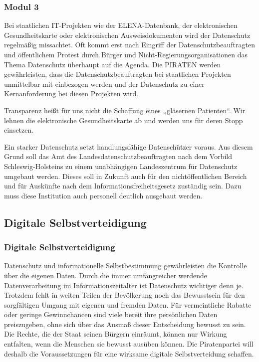 \subsubsection{Modul 3}
\abstimmung
Bei staatlichen IT-Projekten wie der ELENA-Datenbank, der elektronischen Gesundheitskarte oder elektronischen Ausweisdokumenten wird der Datenschutz regelmäßig missachtet. Oft kommt erst nach Eingriff der Datenschutzbeauftragten und öffentlichem Protest durch Bürger und Nicht-Regierungsorganisationen das Thema Datenschutz überhaupt auf die Agenda. Die PIRATEN werden gewährleisten, dass die Datenschutzbeauftragten bei staatlichen Projekten unmittelbar mit einbezogen werden und der Datenschutz zu einer Kernanforderung bei diesen Projekten wird.


\label{datenschutz:egk}
\abstimmung
Transparenz heißt für uns nicht die Schaffung eines „gläsernen Patienten“. Wir lehnen die elektronische Gesundheitskarte ab und werden uns für deren Stopp einsetzen.

\label{datenschutz:staerkung}
\abstimmung
Ein starker Datenschutz setzt handlungsfähige Datenschützer voraus. Aus diesem Grund soll das Amt des Landesdatenschutzbeauftragten nach dem Vorbild Schleswig-Holsteins zu einem unabhängigen Landeszentrum für Datenschutz umgebaut werden. Dieses soll in Zukunft auch für den nichtöffentlichen Bereich und für Auskünfte nach dem Informationsfreiheitsgesetz zuständig sein. Dazu muss diese Institution auch personell deutlich ausgebaut werden.

\subsection*{Digitale Selbstverteidigung}
\label{datenschutz:verteidigung}
\subsubsection{Digitale Selbstverteidigung}
\abstimmung
Datenschutz und informationelle Selbstbestimmung gewährleisten die Kontrolle über die eigenen Daten. Durch die immer umfangreicher werdende Datenverarbeitung im Informationszeitalter ist Datenschutz wichtiger denn je. Trotzdem fehlt in weiten Teilen der Bevölkerung noch das Bewusstsein für den sorgfältigen Umgang mit eigenen und fremden Daten. Für vermeintliche Rabatte oder geringe Gewinnchancen sind viele bereit ihre persönlichen Daten preiszugeben, ohne sich über das Ausmaß dieser Entscheidung bewusst zu sein. Die Rechte, die der Staat seinen Bürgern einräumt, können nur Wirkung entfalten, wenn die Menschen sie bewusst ausüben können. Die Piratenpartei will deshalb die Voraussetzungen für eine wirksame digitale Selbstverteidung schaffen.
